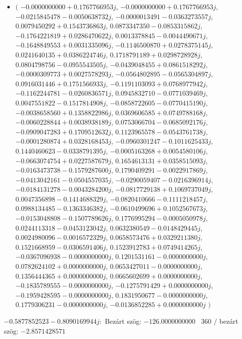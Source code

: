 \documentclass[14pt,a4paper]{article}
\begin{document}
\begin{itemize}
\item
$\big($
$-0.0000000000+0.1767766953j$, $-0.0000000000+0.1767766953j$, $-0.0215845478-0.0050638732j$, $-0.0000013491-0.0363273557j$, $0.0079450292+0.1543736863j$, $0.0873347350-0.0853315862j$, $-0.1764221819+0.0286470622j$, $0.0013378845-0.0044490671j$, $-0.1648849553+0.0031335096j$, $-0.1146500870+0.0278375145j$, $0.0241640135+0.0386224746j$, $0.1718791189+0.0298728928j$, $0.0804798756-0.0955543505j$, $-0.0439048455+0.0861518292j$, $-0.0000309773+0.0027578293j$, $-0.0564802895-0.0565304897j$, $0.0916031446+0.1751566933j$, $-0.1191103093+0.0768977942j$, $-0.1162244781-0.0260836571j$, $0.0945832710-0.0771039469j$, $0.0047551822-0.1517814908j$, $-0.0858722605-0.0770415190j$, $-0.0038658560+0.1358822986j$, $0.0369606585+0.0749788168j$, $-0.0060228844+0.0038938189j$, $0.0753066704-0.0685092176j$, $-0.0909047283+0.1709512632j$, $0.1123965578-0.0543761738j$, $-0.0001280874+0.0328168453j$, $-0.0960301247-0.1011625433j$, $0.1440460623-0.0338791395j$, $-0.0005163268+0.0054580106j$, $-0.0663074754+0.0227587679j$, $0.1654613131+0.0358515093j$, $-0.0163473738-0.1579287600j$, $0.1790409291-0.0022917869j$, $-0.0413042161-0.0504557035j$, $-0.0290059407-0.0216396914j$, $-0.0184131278-0.0043284200j$, $-0.0817729138+0.1069737049j$, $0.0047356898-0.1414688329j$, $-0.0820410666-0.1111218457j$, $0.0988134485-0.1363346382j$, $-0.0610499696+0.1052567673j$, $-0.0153048808-0.1507789626j$, $0.1776995294-0.0005050978j$, $0.0244113318-0.0453123042j$, $0.0632380549-0.0148429445j$, $0.0024980096-0.0016572329j$, $0.0658573476+0.0329211380j$, $0.1521668959-0.0306591406j$, $0.1523912783+0.0749414265j$, $-0.0367096938-0.0000000000j$, $0.1201531161-0.0000000000j$, $0.0782624102+0.0000000000j$, $0.0653427011-0.0000000000j$, $0.1356444365+0.0000000000j$, $0.0665602699+0.0000000000j$, $-0.1835789555-0.0000000000j$, $-0.1275791429+0.0000000000j$, $-0.1959428595-0.0000000000j$, $0.1831950677-0.0000000000j$, $0.1779306231-0.0000000000j$, $-0.0136852285+0.0000000000j$
$\big)$
\end{itemize}
$-0.5877852523-0.8090169944j$:\
Bezárt szög: $-126.0000000000$ \
360 / bezárt szög: $-2.8571428571$\
\end{document}
